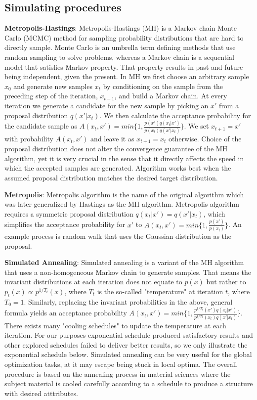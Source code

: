 \documentclass[12pt]{article}
\begin{document}
\subsection{Simulating procedures}
\par \textbf{Metropolis-Hastings}: Metropolis-Hastings (MH) is a Markov chain Monte Carlo (MCMC) method for sampling probability distributions that are hard to directly sample. Monte Carlo is an umbrella term defining methods that use random sampling to solve problems, whereas a Markov chain is a sequential model that satisfies Markov property. That property results in past and future being independent, given the present. In MH we first choose an arbitrary sample $x_0$ and generate new samples $x_t$ by conditioning on the sample from the preceding step of the iteration, $x_{t-1}$, and build a Markov chain. At every iteration we generate a candidate for the new sample by picking an $x'$ from a proposal distribution $q(x'|x_t)$. We then calculate the acceptance probability for the candidate sample as $A(x_t,x') = min\{ 1, \frac{p(x')q(x_t|x')}{p(x_t)q(x'|x_t)} \}$. We set $x_{t+1} = x'$ with probability $A(x_t,x')$ and leave it as $x_{t+1} = x_t$ otherwise. Choice of the proposal distribution does not alter the convergence guarantee of the MH algorithm, yet it is very crucial in the sense that it directly affects the speed in which the accepted samples are generated. Algorithm works best when the assumed proposal distribution matches the desired target distribution.
\par \textbf{Metropolis}: Metropolis algorithm is the name of the original algorithm which was later generalized by Hastings as the MH algorithm. Metropolis algorithm requires a symmetric proposal distribution $q(x_t|x') = q(x'|x_t)$, which simplifies the acceptance probability for $x'$ to $A(x_t,x') = min\{ 1, \frac{p(x')}{p(x_t)} \}$. An example process is random walk that uses the Gaussian distribution as the proposal.
\par \textbf{Simulated Annealing}: Simulated annealing is a variant of the MH algorithm that uses a non-homogeneous Markov chain to generate samples. That means the invariant distributions at each iteration does not equate to $p(x)$ but rather to $p_t(x) \propto p^{1/T_t}(x)$, where $T_t$ is the so-called "temperature" at iteration $t$, where $T_0 = 1$. Similarly, replacing the invariant probabilities in the above, general formula yields an acceptance probability $A(x_t,x') = min\{ 1, \frac{p^{1/T_t}(x')q(x_t|x')}{p^{1/T_t}(x_t)q(x'|x_t)} \}$. There exists many "cooling schedules" to update the temperature at each iteration. For our purposes exponential schedule produced satisfactory results and other explored schedules failed to deliver better results, so we only illustrate the exponential schedule below. Simulated annealing can be very useful for the global optimization tasks, at it may escape being stuck in local optima. The overall procedure is based on the annealing process in material sciences where the subject material is cooled carefully according to a schedule to produce a structure with desired atttributes.
\end{document}
